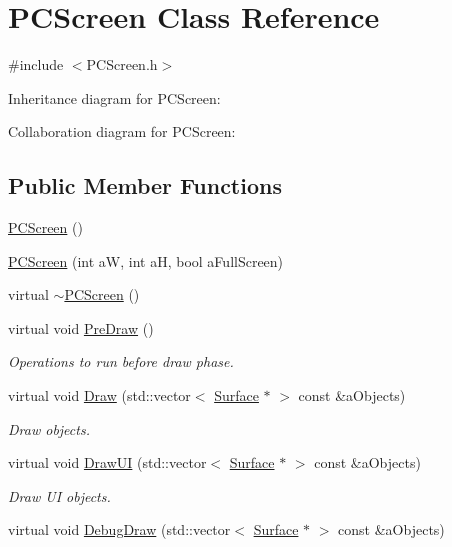 \hypertarget{classPCScreen}{}\section{P\+C\+Screen Class Reference}
\label{classPCScreen}


{\ttfamily \#include $<$P\+C\+Screen.\+h$>$}



Inheritance diagram for P\+C\+Screen\+:


Collaboration diagram for P\+C\+Screen\+:
\subsection*{Public Member Functions}
\begin{DoxyCompactItemize}
\item 
\hyperlink{classPCScreen_abfb8de9c28e9fa5d0e8d79d9b3d44afa}{P\+C\+Screen} ()
\item 
\hyperlink{classPCScreen_a3d6bafbe53e87e09c0f3be47a346206d}{P\+C\+Screen} (int aW, int aH, bool a\+Full\+Screen)
\item 
virtual \hyperlink{classPCScreen_a29d01b7f7fe0184401771fc3f68329ef}{$\sim$\+P\+C\+Screen} ()
\item 
virtual void \hyperlink{classPCScreen_a5e66ab84ff926d7023f46d0c46a0b66c}{Pre\+Draw} ()
\begin{DoxyCompactList}\small\item\em Operations to run before draw phase. \end{DoxyCompactList}\item 
virtual void \hyperlink{classPCScreen_aaaf488147e0324d69f5e4d833594b1b4}{Draw} (std\+::vector$<$ \hyperlink{classSurface}{Surface} $\ast$ $>$ const \&a\+Objects)
\begin{DoxyCompactList}\small\item\em Draw objects. \end{DoxyCompactList}\item 
virtual void \hyperlink{classPCScreen_a39d140fd1852dd76e2bd26b82e7a7ee5}{Draw\+UI} (std\+::vector$<$ \hyperlink{classSurface}{Surface} $\ast$ $>$ const \&a\+Objects)
\begin{DoxyCompactList}\small\item\em Draw UI objects. \end{DoxyCompactList}\item 
virtual void \hyperlink{classPCScreen_ad9bfecd782f10a5bc0d8da32a8de357a}{Debug\+Draw} (std\+::vector$<$ \hyperlink{classSurface}{Surface} $\ast$ $>$ const \&a\+Objects)

\end{DoxyCompactItemize}
